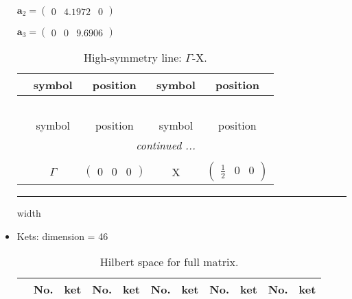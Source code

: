 \documentclass[fleqn,10pt,landscape]{article}
\begin{document}
\begin{itemize}
\quad $\bm{a}_2=\begin{pmatrix} 0 & 4.1972 & 0 \end{pmatrix}$

\quad $\bm{a}_3=\begin{pmatrix} 0 & 0 & 9.6906 \end{pmatrix}$

\begin{center}
\renewcommand{\arraystretch}{1.3}
\begin{longtable}{c|cc|cc}
\caption{High-symmetry line: $\Gamma$-X.}
 \\
 \hline \hline
 & symbol & position & symbol & position \\ \hline \endfirsthead

\multicolumn{4}{l}{\tablename\ \thetable{}} \\
 \hline \hline
 & symbol & position & symbol & position \\ \hline \endhead

 \hline \hline
\multicolumn{4}{r}{\footnotesize\it continued ...} \\ \endfoot

 \hline \hline
\multicolumn{4}{r}{} \\ \endlastfoot

 & $\Gamma$ & $\begin{pmatrix} 0 & 0 & 0 \end{pmatrix}$ & X & $\begin{pmatrix} \frac{1}{2} & 0 & 0 \end{pmatrix}$ \\
\end{longtable}
\end{center}

 \hfil \hrule height 1mm width \textwidth \hfil

\item Kets: dimension = 46
\begin{center}
\renewcommand{\arraystretch}{1.3}
\begin{longtable}{c|cc|cc|cc|cc|cc}
\caption{Hilbert space for full matrix.}
 \\
 \hline \hline
 & No. & ket & No. & ket & No. & ket & No. & ket & No. & ket \\ \hline \endfirsthead


\end{longtable}
\end{center}
\end{itemize}
\end{document}
